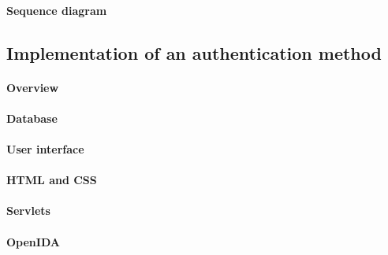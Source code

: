 \documentclass[11pt,a4paper]{article}
\begin{document}
\paragraph{Sequence diagram}

\subsection*{Implementation of an authentication method}
\paragraph{Overview}

\paragraph{Database}
\paragraph{User interface}
\paragraph{HTML and CSS}
\paragraph{Servlets}
\paragraph{OpenIDA}
\end{document}
